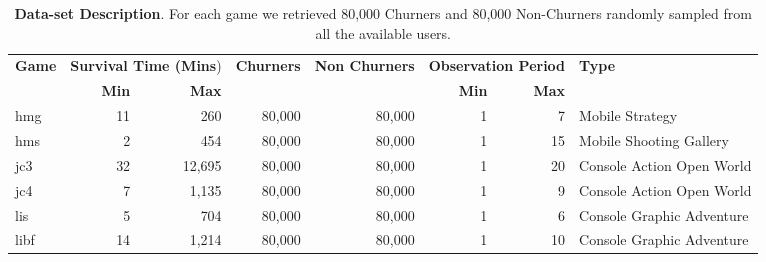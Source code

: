 \begin{table}[h] 
\centering
\caption{\textbf{Data-set Description}. For each game we retrieved 80,000 Churners and 80,000 Non-Churners randomly sampled from all the available users.}
\label{game_description_31}
\begin{tabularx}{\textwidth}{@{}lrrrrrrX@{}}
\toprule

\multirow{2}{*}{\textbf{Game}} & \multicolumn{2}{l}{\textbf{Survival Time (Mins})} & \multirow{2}{*}{\textbf{Churners}} & \multirow{2}{*}{\textbf{Non Churners}} & \multicolumn{2}{l}{\textbf{Observation Period}} & \multirow{2}{*}{\textbf{Type}} \\ \cmidrule(lr){2-3} \cmidrule(lr){6-7}
                      & \textbf{Min}                  & \textbf{Max}                  &                           &                               & \textbf{Min}                & \textbf{Max}               &                                \\ \midrule
hmg                        & 11 & 260    & 80,000 & 80,000  & 1  & 7  & Mobile Strategy                       \\
hms                        & 2 & 454     & 80,000 & 80,000  & 1  & 15 & Mobile Shooting Gallery                \\
jc3                        & 32 & 12,695 & 80,000 & 80,000  & 1  & 20 & Console Action Open World             \\
jc4                        & 7 & 1,135   & 80,000 & 80,000  & 1  & 9  & Console Action Open World           \\
lis                        & 5 & 704     & 80,000 & 80,000  & 1  & 6  & Console Graphic Adventure \\
libf                       & 14 & 1,214  & 80,000 & 80,000  & 1  & 10 &  Console Graphic Adventure \\ \bottomrule
\end{tabularx}
\end{table}
